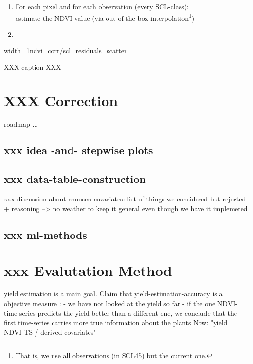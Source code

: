 \begin{enumerate}
    \item For each pixel and for each observation (every SCL-class):\\
          estimate the NDVI value (via out-of-the-box interpolation\footnote{That is, we use all observations (in SCL45) but the current one.})
    \item
\end{enumerate}







\begin{my_figure}[h]{width=1\textwidth}{ndvi_corr/scl_residuals_scatter}
    \caption{XXX caption XXX}
    \label{fig:ndvi_corr/scl_residuals_scatter}
\end{my_figure}


\section{XXX Correction}
roadmap ...

\subsection{xxx idea -and- stepwise plots}

\subsection{xxx data-table-construction}
xxx discussion about choosen covariates:
list of things we considered but rejected + reasoning --> no weather to keep it general even though we have it implemeted

\subsection{xxx ml-methods}



\section{xxx Evalutation Method}
yield estimation is a main goal. 
Claim that yield-estimation-accuracy is a objective measure :
    - we have not looked at the yield so far 
    - if the one NDVI-time-series predicts the yield better than a different one, we conclude that the first time-series carries more true information about the plants
Now: "yield ~ NDVI-TS / derived-covariates" 

